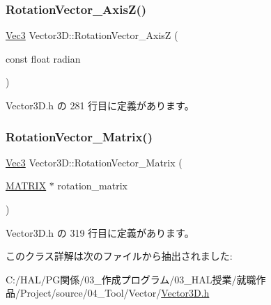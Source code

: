 \subsubsection{\texorpdfstring{Rotation\+Vector\+\_\+\+Axis\+Z()}{RotationVector\_AxisZ()}}
{\footnotesize\ttfamily \mbox{\hyperlink{_vector3_d_8h_ab16f59e4393f29a01ec8b9bbbabbe65d}{Vec3}} Vector3\+D\+::\+Rotation\+Vector\+\_\+\+AxisZ (\begin{DoxyParamCaption}\item[{const float}]{radian }\end{DoxyParamCaption})\hspace{0.3cm}{\ttfamily [inline]}}



 Vector3\+D.\+h の 281 行目に定義があります。

\mbox{\label{class_vector3_d_aa368719da4c1ac4e8a727edbd09ec390}} 
\subsubsection{\texorpdfstring{Rotation\+Vector\+\_\+\+Matrix()}{RotationVector\_Matrix()}}
{\footnotesize\ttfamily \mbox{\hyperlink{_vector3_d_8h_ab16f59e4393f29a01ec8b9bbbabbe65d}{Vec3}} Vector3\+D\+::\+Rotation\+Vector\+\_\+\+Matrix (\begin{DoxyParamCaption}\item[{\mbox{\hyperlink{_vector3_d_8h_a032295cd9fb1b711757c90667278e744}{M\+A\+T\+R\+IX}} $\ast$}]{rotation\+\_\+matrix }\end{DoxyParamCaption})\hspace{0.3cm}{\ttfamily [inline]}}



 Vector3\+D.\+h の 319 行目に定義があります。



このクラス詳解は次のファイルから抽出されました\+:\begin{DoxyCompactItemize}
\item 
C\+:/\+H\+A\+L/\+P\+G関係/03\+\_\+作成プログラム/03\+\_\+\+H\+A\+L授業/就職作品/\+Project/source/04\+\_\+\+Tool/\+Vector/\mbox{\hyperlink{_vector3_d_8h}{Vector3\+D.\+h}}\end{DoxyCompactItemize}
